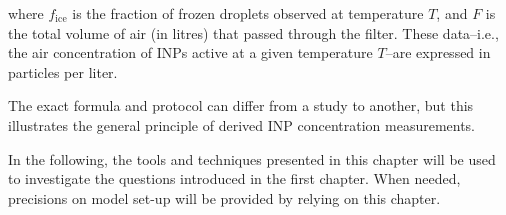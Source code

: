 where $f_{\text{ice}}$ is the fraction of frozen droplets observed at temperature $T$, and $F$ is the total volume of air (in litres) that passed through the filter.
These data\---i.e., the air concentration of INPs active at a given temperature $T$\---are expressed in particles per liter.

The exact formula and protocol can differ from a study to another, but this illustrates the general principle of derived INP concentration measurements.
\vspace{\baselineskip}

In the following, the tools and techniques presented in this chapter will be used to investigate the questions introduced in the first chapter. 
When needed, precisions on model set-up will be provided by relying on this chapter.

\newpage
\mbox{}
\newpage

\stopcontents[chapters]
